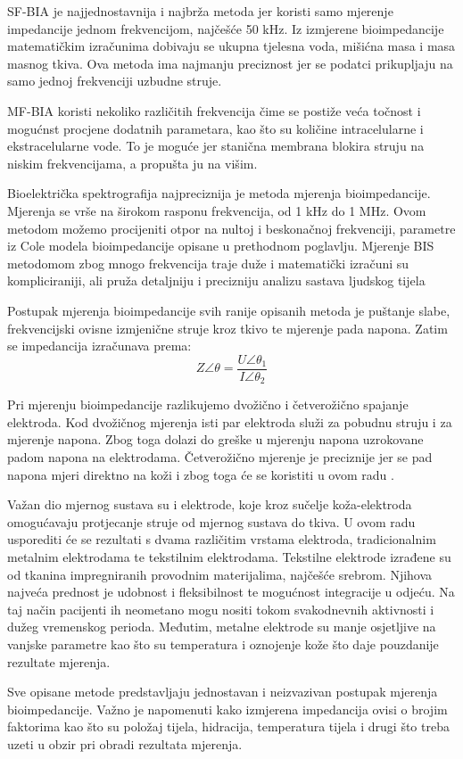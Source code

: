 \documentclass[../diplomski_rad.tex]{subfiles}
\begin{document}
SF-BIA je najjednostavnija i najbrža metoda jer koristi samo mjerenje impedancije jednom frekvencijom, najčešće 50 kHz. 
Iz izmjerene bioimpedancije matematičkim izračunima dobivaju se ukupna tjelesna voda, mišićna masa i masa masnog tkiva. 
Ova metoda ima najmanju preciznost jer se podatci prikupljaju na samo jednoj frekvenciji uzbudne struje.

MF-BIA koristi nekoliko različitih frekvencija čime se postiže veća točnost i mogućnst procjene dodatnih parametara, 
kao što su količine intracelularne i ekstracelularne vode. To je moguće jer stanična membrana blokira struju na niskim frekvencijama, 
a propušta ju na višim. 

Bioelektrička spektrografija najpreciznija je metoda mjerenja bioimpedancije. 
Mjerenja se vrše na širokom rasponu frekvencija, od 1 kHz do 1 MHz.  
Ovom metodom možemo procijeniti otpor na nultoj i beskonačnoj frekvenciji, parametre iz Cole modela bioimpedancije 
opisane u prethodnom poglavlju. 
Mjerenje BIS metodomom zbog mnogo frekvencija traje duže i matematički izračuni su kompliciraniji, 
ali pruža  detaljniju i precizniju analizu sastava ljudskog tijela

Postupak mjerenja bioimpedancije svih ranije opisanih metoda je puštanje slabe, 
frekvencijski ovisne izmjenične struje kroz tkivo te mjerenje pada napona. 
Zatim se impedancija izračunava prema:
\begin{equation}
    \label{jed:prvajednadzba}
    Z\angle\theta = \frac{U\angle\theta_{1}}{I\angle\theta_{2}} 
\end{equation} 

Pri mjerenju bioimpedancije razlikujemo dvožično i četverožično spajanje elektroda. 
Kod dvožičnog mjerenja isti par elektroda služi za pobudnu struju i za mjerenje napona. 
Zbog toga dolazi do greške u mjerenju napona uzrokovane padom napona na elektrodama. 
Četverožično mjerenje je preciznije jer se pad napona mjeri direktno na koži i zbog toga će se koristiti u ovom radu \cite{Abasi2022}. 

Važan dio mjernog sustava su i elektrode, koje kroz sučelje koža-elektroda omogućavaju protjecanje struje od mjernog sustava do tkiva. 
U ovom radu usporediti će se rezultati s dvama različitim vrstama elektroda, tradicionalnim metalnim elektrodama te tekstilnim elektrodama. 
Tekstilne elektrode izrađene su od tkanina impregniranih provodnim materijalima, najčešće srebrom. 
Njihova najveća prednost je udobnost i fleksibilnost te mogućnost integracije u odjeću.
Na taj način pacijenti ih neometano mogu nositi tokom svakodnevnih aktivnosti i dužeg vremenskog perioda. 
Međutim, metalne elektrode su manje osjetljive na vanjske parametre kao što su temperatura i oznojenje kože što daje pouzdanije rezultate mjerenja. 
\cite{Meding2021}

Sve opisane metode predstavljaju jednostavan i neizvazivan postupak mjerenja bioimpedancije. 
Važno je napomenuti kako izmjerena impedancija ovisi o brojim faktorima kao što su položaj tijela, hidracija, temperatura tijela i drugi 
što treba uzeti u obzir pri obradi rezultata mjerenja.
\end{document}
